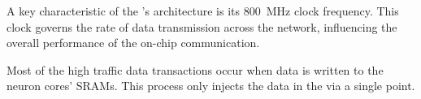 A key characteristic of the \confignoc{}'s architecture is its \SI{800}{MHz} clock frequency.
This clock governs the rate of data transmission across the network, influencing the overall performance of the on-chip communication.

Most of the high traffic data transactions occur when data is written to the neuron cores' SRAMs.
This process only injects the data in the \confignoc{} via a single point.
